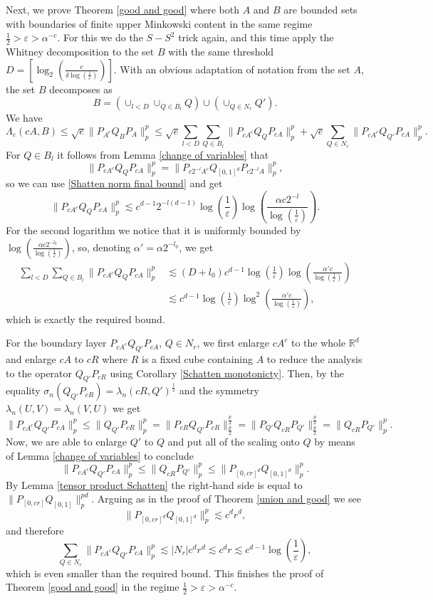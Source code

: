 \documentclass[12pt]{amsart}
\numberwithin{equation}{section}
\newcommand{\R}{\mathbb{R}}
\newcommand{\eps}{\varepsilon}
\begin{document}
Next, we prove Theorem \ref{good and good} where both $A$ and $B$ are bounded sets with boundaries of finite upper Minkowski content in the same regime $\frac{1}{2} > \eps > \alpha^{-c}$. For this we do the $S-S^2$ trick again, and this time apply the Whitney decomposition to the set $B$ with the same threshold $D = \left[\log_2\left(\frac{c}{\delta \log(\frac{1}{\eps})}\right)\right]$. With an obvious adaptation of notation from the set $A$, the set $B$ decomposes as 
$$B = \left(\cup_{l < D}\cup_{Q\in B_l} Q\right) \cup \left(\cup_{Q\in N_r} Q'\right).$$
We have 
$$\Lambda_\eps(cA, B) \le \sqrt{e}\|P_{A^c}Q_BP_A\|_p^p \le \sqrt{e}\sum_{l < D}\sum_{Q\in B_l}\|P_{cA^c}Q_QP_{cA}\|_p^p + \sqrt{e}\sum_{Q\in N_r} \|P_{cA^c}Q_{Q'}P_{cA}\|_p^p.$$
For $Q\in B_l$ it follows from Lemma \ref{change of variables} that
$$\|P_{cA^c}Q_QP_{cA}\|_p^p = \|P_{c2^{-l}A^c}Q_{[0,1]^d}P_{c2^{-l}A}\|_p^p,$$
so we can use \eqref{Shatten norm final bound} and get
$$\|P_{cA^c}Q_QP_{cA}\|_p^p \lesssim c^{d-1}2^{-l(d-1)}\log\left(\frac{1}{\eps}\right)\log\left(\frac{\alpha c2^{-l}}{\log\left(\frac{1}{\eps}\right)}\right).$$
For the second logarithm we notice that it is uniformly bounded by $\log\left(\frac{\alpha c2^{-l_0}}{\log\left(\frac{1}{\eps}\right)}\right)$, so, denoting $\alpha' = \alpha 2^{-l_0}$, we get
\begin{align*}
\sum_{l < D}\sum_{Q\in B_l}\|P_{cA^c}Q_QP_{cA}\|_p^p &\lesssim (D+l_0)c^{d-1}\log\left(\frac{1}{\eps}\right)\log\left(\frac{\alpha' c}{\log\left(\frac{1}{\eps}\right)}\right)\\
&\lesssim c^{d-1}\log\left(\frac{1}{\eps}\right)\log^2\left(\frac{\alpha' c}{\log\left(\frac{1}{\eps}\right)}\right),
\end{align*}
which is exactly the required bound.

For the boundary layer $P_{cA^c}Q_{Q'}P_{cA}$, $Q\in N_r$, we first enlarge $cA^c$ to the whole $\R^d$ and enlarge $cA$ to $cR$ where $R$ is a fixed cube containing $A$ to reduce the analysis to the operator $Q_{Q'}P_{cR}$ using Corollary \ref{Schatten monotonicty}. Then, by the equality $\sigma_n(Q_{Q'} P_{cR}) = \lambda_n(cR,Q')^{\frac{1}{2}}$ and the symmetry $\lambda_n(U,V) = \lambda_n(V,U)$ we get
$$\|P_{cA^c}Q_{Q'}P_{cA} \|^p_p \leq \| Q_{Q'} P_{cR}\|_p^p = \|P_{cR} Q_{Q'}P_{cR}\|_{\frac{p}{2}}^{\frac{p}{2}} = \|P_{Q'}Q_{cR}P_{Q'}\|_{\frac{p}{2}}^{\frac{p}{2}}=\|Q_{cR}P_{Q'}\|^p_p.$$
Now, we are able to enlarge $Q'$ to $Q$ and put all of the scaling onto $Q$ by means of Lemma \ref{change of variables} to conclude
$$\|P_{cA^c}Q_{Q'}P_{cA} \|^p_p \leq \|Q_{cR}P_{Q'}\|^p_p\leq \|P_{[0, cr]^d}Q_{[0,1]^d}\|_p^p.$$
By Lemma \ref{tensor product Schatten} the right-hand side is equal to $\|P_{[0, cr]}Q_{[0,1]}\|_p^{pd}$. Arguing  as in the proof of Theorem \ref{union and good} we see
$$\|P_{[0, cr]^d}Q_{[0,1]^d}\|_p^p \lesssim c^d r^d,$$
and therefore
$$\sum_{Q\in N_r} \| P_{cA^c}Q_{Q'}P_{cA}\|^p_p \lesssim |N_r| c^d r^d \lesssim c^dr \lesssim c^{d-1}\log\left(\frac{1}{\eps}\right),$$
which is even smaller than the required bound. This finishes the proof of Theorem \ref{good and good} in the regime $\frac{1}{2} > \eps > \alpha^{-c}$.
\end{document}
